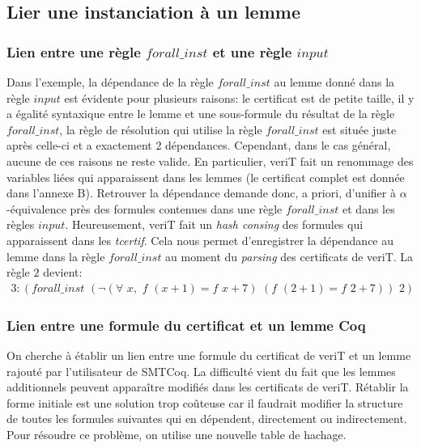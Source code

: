 \documentclass[11pt]{article}
\begin{document}
\subsection{Lier une instanciation à un lemme} \label{lien}

\subsubsection{Lien entre une règle $forall\_inst$ et une règle $input$} \label{lien_parsing}

Dans l'exemple, la dépendance de la règle $forall\_inst$ au lemme donné dans la règle $input$ est évidente pour plusieurs raisons: le certificat est de petite taille, il y a égalité syntaxique entre le lemme et une sous-formule du résultat de la règle $forall\_inst$, la règle de résolution qui utilise la règle $forall\_inst$ est située juste après celle-ci et a exactement 2 dépendances. Cependant, dans le cas général, aucune de ces raisons ne reste valide. En particulier, veriT fait un renommage des variables liées qui apparaissent dans les lemmes (le certificat complet est donnée dans l'annexe B). Retrouver la dépendance demande donc, a priori, d'unifier à $\alpha$-équivalence près des formules contenues dans une règle $forall\_inst$ et dans les règles $input$. Heureusement, veriT fait un \textit{hash consing} des formules qui apparaissent dans les \textit{tcertif}. Cela nous permet d'enregistrer la dépendance au lemme dans la règle $forall\_inst$ au moment du \textit{parsing} des certificats de veriT. La règle $2$ devient: 
\begin{align*}
3:(forall\_inst \,\, (\neg(\forall \,\,x, \,\,f \,\,(x+1) = f\,\,x+7) \,\,(f\,\, (2+1) = f\,\,2+7)) \,\,2) 
\end{align*}

\subsubsection{Lien entre une formule du certificat et un lemme Coq} \label{lien_formule_lemme}

On cherche à établir un lien entre une formule du certificat de veriT et un lemme rajouté par l'utilisateur de SMTCoq. La difficulté vient du fait que les lemmes additionnels peuvent apparaître modifiés dans les certificats de veriT. Rétablir la forme initiale est une solution trop coûteuse car il faudrait modifier la structure de toutes les formules suivantes qui en dépendent, directement ou indirectement. Pour résoudre ce problème, on utilise une nouvelle table de hachage. \medbreak
\end{document}
